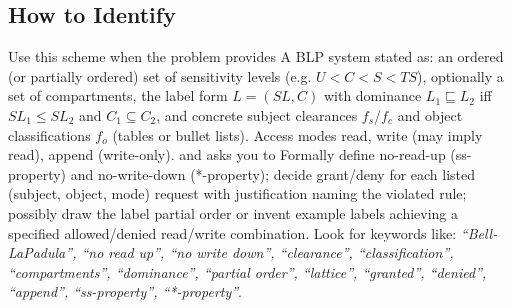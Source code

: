 \documentclass[12pt, a4paper]{article}
\begin{document}
\subsection*{How to Identify}
Use this scheme when the problem provides A BLP system stated as: an ordered (or partially ordered) set of sensitivity levels (e.g. $U < C < S < TS$), optionally a set of compartments, the label form $L = (SL, C)$ with dominance $L_1 \sqsubseteq L_2$ iff $SL_1 \leq SL_2$ and $C_1 \subseteq C_2$, and concrete subject clearances $f_s$/$f_c$ and object classifications $f_o$ (tables or bullet lists). Access modes read, write (may imply read), append (write-only). and asks you to Formally define no-read-up (ss-property) and no-write-down (*-property); decide grant/deny for each listed (subject, object, mode) request with justification naming the violated rule; possibly draw the label partial order or invent example labels achieving a specified allowed/denied read/write combination. Look for keywords like: \textit{``Bell-LaPadula'', ``no read up'', ``no write down'', ``clearance'', ``classification'', ``compartments'', ``dominance'', ``partial order'', ``lattice'', ``granted'', ``denied'', ``append'', ``ss-property'', ``*-property''}.
\end{document}
